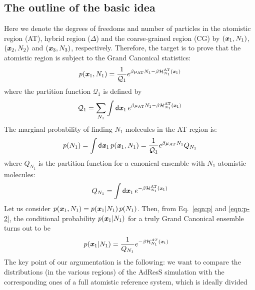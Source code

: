 \documentclass[aps,a4paper,reprint,onecolumn]{revtex4}
\newcommand{\vect}[1]{\textbf{\textit{#1}}}
\newcommand{\dd}[1]{\textsf{#1}}
\newcommand{\AT}{{\textrm{{AT}}}}
\newcommand{\HY}{{\Delta}}
\begin{document}
\subsection{The outline of the basic idea}
Here we denote the degrees of freedoms and number of particles in the
atomistic region (AT), hybrid region ($\HY$) and the coarse-grained
region (CG) by $(\vect x_1, N_1)$, $(\vect x_2, N_2)$ and $(\vect x_3,
N_3)$, respectively. Therefore, the target is to prove that the atomistic
region is subject to the Grand Canonical statistics: 
\begin{align}\label{eqn:p}
  p(\vect x_1, N_1) = \frac{1}{\mathcal Q_1}
  e^{\beta\mu_{\AT} N_1 - \beta \mathcal H_{N_1}^{\AT}(\vect x_1)} 
\end{align}
where the partition function $\mathcal Q_1$ is defined by
\begin{align}
  \mathcal Q_1 =
  \sum_{N_1}\int
  \dd d\vect x_1\,
  e^{\beta\mu_{\AT} N_1 - \beta \mathcal H_{N_1}^{\AT}(\vect x_1)}
\end{align}
The marginal probability of finding $N_1$ molecules in the
AT region is:
\begin{align}\label{eqn:p-2}
  p(N_1) = \int\dd d\vect x_1\, p(\vect x_1, N_1)
  =
  \frac{1}{\mathcal Q_1}e^{\beta\mu_{AT} N_1}Q_{N_1}
\end{align}
where $Q_{N_1}$ is the partition function for a canonical ensemble
with $N_1$ atomistic molecules:
\begin{align}
  Q_{N_1}  =
  \int\dd d\vect x_1\,
  e^{ - \beta \mathcal H_{N_1}^{\AT}(\vect x_1)}
\end{align}
Let us consider
$p(\vect x_1, N_1) = p(\vect x_1 | N_1)\,p(N_1)$. Then,
from Eq.~\eqref{eqn:p} and \eqref{eqn:p-2},
the conditional probability $p(\vect x_1 | N_1)$
for a truly Grand Canonical ensemble turns out to be
\begin{align}\label{eqn:p-1}
  p(\vect x_1 | N_1) &= \frac{1}{Q_{N_1}} e^{-\beta \mathcal H_{N_1}^{AT}(\vect x_1)} \end{align}
The key point of our argumentation is the following: we want to compare
the distributions (in the various regions) of the AdResS simulation
with the corresponding ones of a full atomistic reference system, which is ideally divided
\end{document}
